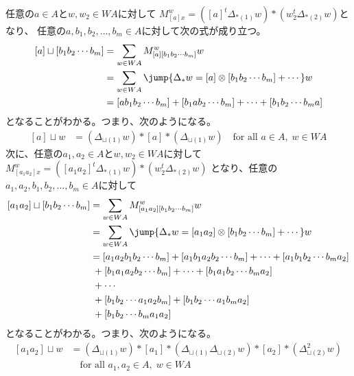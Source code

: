 	任意の$a\in A$と$w,w_2\in WA$に対して
	$M_{[a]x}^w=([a]^t\Delta_{*(1)}w)*(w_2^t\Delta_{*(2)}w)$となり、
	任意の$a,b_1,b_2,\dots,b_m\in A$に対して次の式が成り立つ。
	\begin{equation*}\begin{split} %
		[a]\sqcup [b_1b_2\cdots b_m]
		&= \sum_{w\in WA}M_{[a][b_1b_2\cdots b_m]}^ww \\
		&= \sum_{w\in WA}\jump{\Delta_*w=[a]\otimes [b_1b_2\cdots b_m]+\cdots}w \\
		&= [ab_1b_2\cdots b_m] + [b_1ab_2\cdots b_m]
			+ \cdots + [b_1b_2\cdots b_ma] \\
	\end{split}\end{equation*} %
	となることがわかる。つまり、次のようになる。
	\begin{equation*}\begin{split} %
		[a]\sqcup w &= (\Delta_{\sqcup(1)}w)*[a]*(\Delta_{\sqcup(1)}w)
		\quad\text{for all }a\in A,\;w\in WA
	\end{split}\end{equation*} %
	次に、任意の$a_1,a_2\in A$と$w,w_2\in WA$に対して
	$M_{[a_1a_2]x}^w=([a_1a_2]^t\Delta_{*(1)}w)*(w_2^t\Delta_{*(2)}w)$
	となり、任意の$a_1,a_2,b_1,b_2,\dots,b_m\in A$に対して
	\begin{equation*}\begin{split} %
		[a_1a_2]\sqcup [b_1b_2\cdots b_m]
		&= \sum_{w\in WA}M_{[a_1a_2][b_1b_2\cdots b_m]}^ww \\
		&= \sum_{w\in WA}\jump{\Delta_*w=[a_1a_2]\otimes [b_1b_2\cdots b_m]+\cdots}w \\
		&= [a_1a_2b_1b_2\cdots b_m] + [a_1b_1a_2b_2\cdots b_m]
			+ \cdots + [a_1b_1b_2\cdots b_ma_2] \\
		&\;+ [b_1a_1a_2b_2\cdots b_m] + \cdots + [b_1a_1b_2\cdots b_ma_2] \\
		&\;+ \cdots \\
		&\;+ [b_1b_2\cdots a_1a_2b_m] + [b_1b_2\cdots a_1b_ma_2] \\
		&\;+ [b_1b_2\cdots b_ma_1a_2] \\
	\end{split}\end{equation*} %
	となることがわかる。つまり、次のようになる。
	\begin{equation*}\begin{split} %
		[a_1a_2]\sqcup w
		&= (\Delta_{\sqcup(1)}w)*[a_1]
		*(\Delta_{\sqcup(1)}\Delta_{\sqcup(2)}w)*[a_2]
		*(\Delta_{\sqcup(2)}^2w) \\
		&\quad\text{for all }a_1,a_2\in A,\;w\in WA
	\end{split}\end{equation*} %
